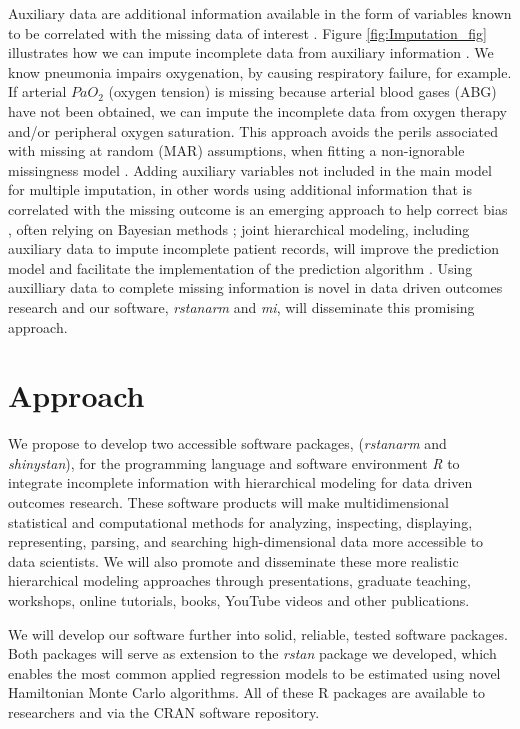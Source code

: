 \documentclass[11pt,notitlepage]{article}
\begin{document}
Auxiliary data are additional information available in the form of variables known 
to be correlated with the missing data of interest 
\cite{Hall_25389642,Daniels24571539}. Figure \ref{fig:Imputation_fig} 
illustrates how we can impute incomplete data from auxiliary information 
\cite{Ibrahim2001auxilliaryImputaton,Schomaker23873614}. We know pneumonia 
impairs oxygenation, by causing respiratory failure, for example. If 
arterial $PaO_2$ (oxygen tension) is missing because arterial blood 
gases (ABG) have not been obtained, we can impute the incomplete data 
from oxygen therapy and/or peripheral oxygen saturation\cite{Hall_25389642}. 
This approach avoids the perils associated with missing at random (MAR) 
assumptions, when fitting a non-ignorable missingness model \cite{Wang_20029935}. 
Adding auxiliary variables not included in the main model for multiple imputation, 
in other words using additional information that is correlated with the missing 
outcome is an emerging approach to help correct bias 
\cite{Meng1994, Collins_11778676, Rubin1996}, often relying on 
Bayesian methods \cite{Daniels2008, Schafer1997}; joint hierarchical 
modeling, including auxiliary data to impute incomplete patient records, 
will improve the prediction model and facilitate the implementation of the 
prediction algorithm \cite{Hall_25389642}. Using auxilliary data to complete 
missing information is novel in data driven outcomes research and our 
software, \textit{rstanarm} and \textit{mi}, will disseminate this promising approach. 

\part*{Approach}

We propose to develop two accessible software packages, (\textit{rstanarm} 
and \textit{shinystan}), for the programming language and software environment 
\textit{R} to integrate incomplete information with hierarchical modeling for 
data driven outcomes research. These software products will make 
multidimensional statistical and computational methods for 
analyzing, inspecting, displaying, representing, parsing, and 
searching high-dimensional data more accessible to 
data scientists. We will also promote and disseminate these more realistic 
hierarchical modeling approaches through presentations, graduate teaching, 
workshops, online tutorials, books, YouTube videos and other publications.

We will develop our software further into solid, reliable, tested software packages. 
Both packages will serve as extension to the \textit{rstan} package we developed, 
which enables the most common applied regression models to be estimated using 
novel Hamiltonian Monte Carlo algorithms. All of these R packages are available to 
researchers and via the CRAN software repository. 
\end{document}
